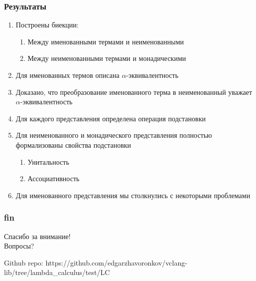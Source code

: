 \documentclass{beamer}
\begin{document}
\begin{frame}\frametitle{Результаты}
    \begin{enumerate}
        \item Построены биекции:
            \begin{enumerate}
                \item Между именованными термами и неименованными
                \item Между неименованными термами и монадическими
            \end{enumerate}
        \item Для именованных термов описана $\alpha$-эквивалентность
        \item Доказано, что преобразование именованного терма в неименованный уважает $\alpha$-эквивалентность
        \item Для каждого представления определена операция подстановки
        \item Для неименованного и монадического представления полностью формализованы свойства подстановки
          \begin{enumerate}
              \item Унитальность
              \item Ассоциативность
          \end{enumerate}
        \item Для именованного представления мы столкнулись с некоторыми проблемами
    \end{enumerate}
\end{frame}


\begin{frame}\frametitle{fin}
    \begin{center}
        \Huge Спасибо за внимание! \\ Вопросы?
    \end{center}

    \begin{block}{Github repo:}
        \footnotesize{https://github.com/edgarzhavoronkov/vclang-lib/tree/lambda\_calculus/test/LC}
    \end{block}
\end{frame}
\end{document}
